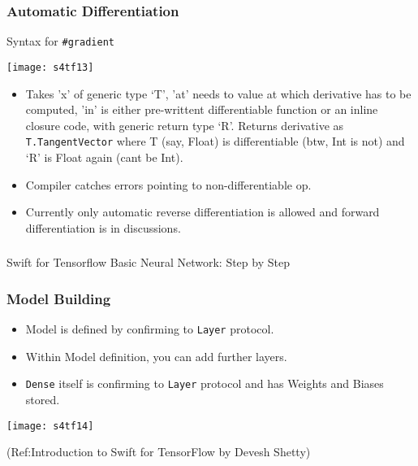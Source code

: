 \begin{frame}[fragile] \frametitle{Automatic Differentiation}

Syntax for \lstinline|#gradient|

\begin{center}
\texttt{[image: s4tf13]}
\end{center}


\begin{itemize}
\item Takes 'x' of generic type `T', 'at' needs to value at which derivative has to be computed, 'in' is either pre-writtent differentiable function or an inline closure code, with generic return type `R'. Returns derivative as \lstinline|T.TangentVector| where T (say, Float) is differentiable (btw, Int is not) and `R' is Float again (cant be Int).
\item Compiler catches errors pointing to non-differentiable op.
\item Currently only automatic reverse differentiation is allowed and forward differentiation is in discussions.
\end{itemize}


\end{frame}

\begin{frame}[fragile]\frametitle{}
\begin{center}
{\Large Swift for Tensorflow Basic Neural Network: Step by Step}
\end{center}
\end{frame}

\begin{frame}[fragile] \frametitle{Model Building}

\begin{itemize}
\item Model is defined by confirming to \lstinline|Layer| protocol.
\item Within Model definition, you can add further layers.
\item \lstinline|Dense| itself is confirming to \lstinline|Layer| protocol and has Weights and Biases stored.
\end{itemize}

\begin{center}
\texttt{[image: s4tf14]}
\end{center}


{\tiny (Ref:Introduction to Swift for TensorFlow by Devesh Shetty)}

\end{frame}

